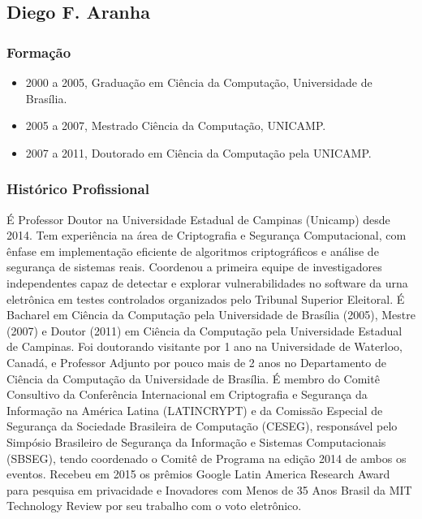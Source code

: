 \documentclass[12pt]{article}
\begin{document}
\subsection{Diego F. Aranha}

\subsubsection*{Formação}
\begin{itemize}\setlength\itemsep{1pt}
\item 2000 a 2005, Graduação em Ciência da Computação, Universidade de Brasília.
\item 2005 a 2007, Mestrado Ciência da Computação, UNICAMP.
\item 2007 a 2011, Doutorado em Ciência da Computação pela UNICAMP.
\end{itemize}

\subsubsection*{Histórico Profissional}

É Professor Doutor na Universidade Estadual de Campinas (Unicamp) desde 2014. Tem experiência na área de Criptografia e Segurança Computacional, com ênfase em implementação eficiente de algoritmos criptográficos e análise de segurança de sistemas reais. Coordenou a primeira equipe de investigadores independentes capaz de detectar e explorar vulnerabilidades no software da urna eletrônica em testes controlados organizados pelo Tribunal Superior Eleitoral. É Bacharel em Ciência da Computação pela Universidade de Brasília (2005), Mestre (2007) e Doutor (2011) em Ciência da Computação pela Universidade Estadual de Campinas. Foi doutorando visitante por 1 ano na Universidade de Waterloo, Canadá, e Professor Adjunto por pouco mais de 2 anos no Departamento de Ciência da Computação da Universidade de Brasília. É membro do Comitê Consultivo da Conferência Internacional em Criptografia e Segurança da Informação na América Latina (LATINCRYPT) e da Comissão Especial de Segurança da Sociedade Brasileira de Computação (CESEG), responsável pelo Simpósio Brasileiro de Segurança da Informação e Sistemas Computacionais (SBSEG), tendo coordenado o Comitê de Programa na edição 2014 de ambos os eventos. Recebeu em 2015 os prêmios Google Latin America Research Award para pesquisa em privacidade e Inovadores com Menos de 35 Anos Brasil da MIT Technology Review por seu trabalho com o voto eletrônico.
\end{document}
